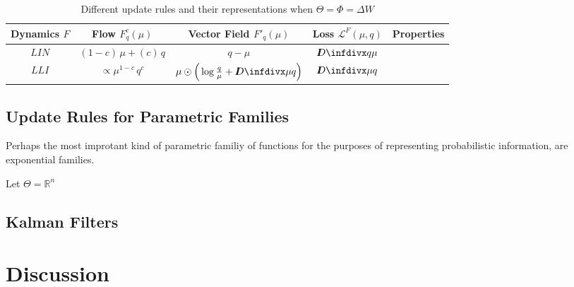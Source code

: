 \begin{table*}
\centering
\begin{tabular}{c|ccc|c}\toprule
    Dynamics $F$ & Flow $F^c_q(\mu)$
        & Vector Field $F'_q(\mu)$
        & Loss $\mathcal L^{F}(\mu, q)$
        & Properties
        \\\midrule
    $\mathit{LIN}$
        & $%
            (1-c)\,\mu + (c)\, q$
        & $%
            q - \mu$
        & $%
            \kldiv{q}{\mu}$
        & \\
    $\mathit{LLI}$
        & $\propto
            \mu^{1-c}\, q^c$
        & $\mu \odot \Big( \log \frac q \mu + \kldiv\mu q \Big)$
        & $\kldiv\mu q$
        &\\
    \bottomrule
\end{tabular}
\caption{Different update rules and their representations when $\Theta = \Phi = \Delta W$ }
\end{table*}


\subsection{Update Rules for Parametric Families}

Perhaps the most improtant kind of parametric familiy of functions for the purposes of representing probabilistic information, are exponential families. 

Let $\Theta = \mathbb R^{n}$ 

\subsection{Kalman Filters}

\section{Discussion}



